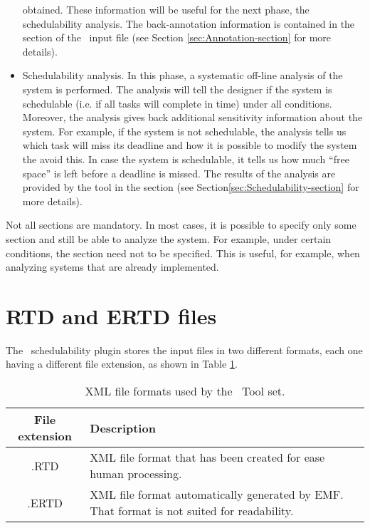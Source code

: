 \begin{itemize}
  obtained. These information will be useful for the next phase, the
  schedulability analysis. The back-annotation information is
  contained in the  section of the \rtd\ input file
  (see Section \ref{sec:Annotation-section} for more details).
\item Schedulability analysis. In this phase, a systematic off-line
  analysis of the system is performed. The analysis will tell the
  designer if the system is schedulable (i.e. if all tasks will
  complete in time) under all conditions. Moreover, the analysis gives
  back additional sensitivity information about the system. For
  example, if the system is not schedulable, the analysis tells us
  which task will miss its deadline and how it is possible to modify
  the system the avoid this.  In case the system is schedulable, it
  tells us how much ``free space'' is left before a deadline is
  missed. The results of the analysis are provided by the tool in the
   section (see
  Section\ref{sec:Schedulability-section} for more details).
\end{itemize}

Not all sections are mandatory. In most cases, it is possible to
specify only some section and still be able to analyze the system. For
example, under certain conditions, the  section need
not to be specified. This is useful, for example, when analyzing
systems that are already implemented.


\section{RTD and ERTD files}

The \rtd\ schedulability plugin stores the input files in two
different formats, each one having a different file extension, as
shown in Table \ref{tab:file-formats}.

%
\begin{table}
\begin{centering}
\begin{tabular}{|c|p{7cm}|}
\hline 
File extension & Description
\tabularnewline
\hline
\hline 
.RTD & XML file format that has been created for ease human processing.
\tabularnewline
\hline 
.ERTD & XML file format automatically generated by EMF. That format is not
suited for readability. 
\tabularnewline
\hline
\end{tabular}
\par\end{centering}

\caption{XML file formats used by the \rtd\ Tool set.}
\label{tab:file-formats}
\end{table}


